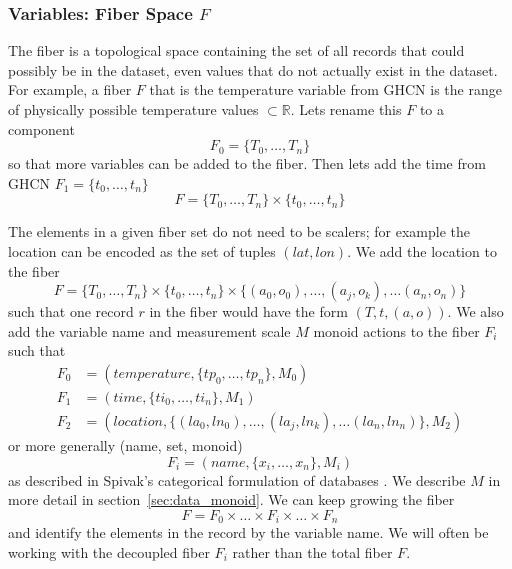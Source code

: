 \documentclass[../main.tex]{subfiles}
\begin{document}
\subsubsection{Variables: Fiber Space $F$}
\label{sec:data_fiber}
The fiber is a topological space containing the set of all records that could possibly be in the dataset, even values that do not actually exist in the dataset. For example, a fiber $F$ that is the temperature variable from GHCN is the range of physically possible temperature values $ \mathscr{}\subset \mathbb{R}$. Lets rename this $F$ to a component 
\begin{equation}
F_0 = \{T_0, \ldots, T_n\} 
\end{equation}
so that more variables can be added to the fiber. Then lets add the time from GHCN $F_1 =\{t_0, \ldots, t_n\}$
\begin{equation}
F =  \{T_0, \ldots, T_n\}  \times \{t_0, \ldots, t_n\} 
\end{equation}

The elements in a given fiber set do not need to be scalers; for example the location can be encoded as the set of tuples $(\textit{lat},\textit{lon})$.  We add the location to the fiber 
\begin{equation}
    F = \{T_0, \ldots, T_n\}  \times \{t_0, \ldots, t_n\} \times 
    \{(a_0, o_0),\ldots, (a_j, o_k), \ldots (a_n, o_n)\}
\end{equation}
such that one record $r$ in the fiber would have the form $(T, t, (a, o))$. We also add the variable name and measurement scale $M$ monoid actions to the fiber $F_i$ such that 
\begin{align}
    F_0 &= (\textit{temperature}, \{tp_0, \ldots, tp_n\}, M_0)\\
    F_1 &= (\textit{time}, \{ti_0, \ldots, ti_n\}, M_1)\\
    F_2 &= (\textit{location},   \{(la_0, ln_0),\ldots, (la_j, ln_k), \ldots (la_n,ln_n)\}, M_2)
\end{align}
 or more generally (name, set, monoid)
 \begin{equation}
    F_i = (\textit{name}, \{x_{i}, \ldots, x_{n}\}, M_{i})
 \end{equation}
as described in Spivak's categorical formulation of databases \cite{spivakSIMPLICIALDATABASES}. We describe $M$ in more detail in section~\ref{sec:data_monoid}. We can keep growing the fiber
\begin{equation}
F= F_{0} \times \ldots \times F_{i}\times\ldots\times F_{n}
\end{equation}
and identify the elements in the record by the variable name. We will often be working with the decoupled fiber $F_i$ rather than the total fiber $F$. 
\end{document}
